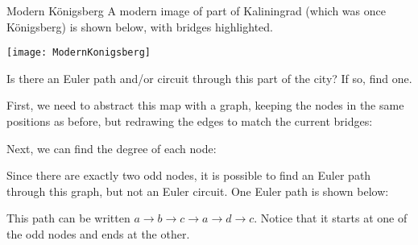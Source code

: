 \begin{example}{Modern K\"onigsberg}
A modern image of part of Kaliningrad (which was once K\"onigsberg) is shown below, with bridges highlighted.
\begin{center}
\texttt{[image: ModernKonigsberg]}
\end{center}
Is there an Euler path and/or circuit through this part of the city?  If so, find one.

\sol
First, we need to abstract this map with a graph, keeping the nodes in the same positions as before, but redrawing the edges to match the current bridges:
\begin{center}
\end{center}

Next, we can find the degree of each node:
\begin{center}
\end{center}

Since there are exactly two odd nodes, it is possible to find an Euler path through this graph, but not an Euler circuit.  One Euler path is shown below:
\begin{center}
\end{center}
This path can be written $\boxed{a \to b \to c \to a \to d \to c}$.  Notice that it starts at one of the odd nodes and ends at the other.
\end{example}
\pagebreak

